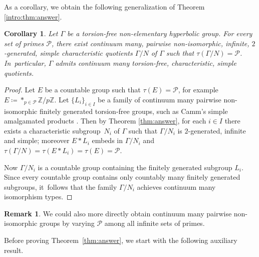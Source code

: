 \documentclass[11pt]{article}
\newtheorem{corollary}[theorem]{Corollary}
\theoremstyle{definition}
\newtheorem{remark}[theorem]{Remark}
\begin{document}
As a corollary, we obtain the following generalization of Theorem \ref{intro:thm:answer}.

\begin{corollary}
\label{cor:answer}
Let $\Gamma$ be a torsion-free non-elementary hyperbolic group. For every set of primes $\mathcal{P}$, there exist continuum many, pairwise non-isomorphic, infinite, $2$\nobreakdash-generated, simple characteristic quotients $\Gamma/N$ of $\Gamma$ such that $\tau(\Gamma/N) = \mathcal{P}$. In~particular, $\Gamma$ admits continuum many torsion-free, characteristic, simple quotients.
\end{corollary}

\begin{proof}
Let $E$ be a countable group such that $\tau(E) \!=\! \mathcal{P}$, for example \hbox{$E \!\coloneqq\! \ast_{p \in \mathcal{P}} \mathbb{Z}/p\mathbb{Z}$}.
Let $\{ L_i \}_{i \in I}$ be a family of continuum many pairwise non-isomorphic finitely generated torsion-free groups, such as Camm's simple amalgamated products \cite{camm}.
Then by Theorem \ref{thm:answer}, for each $i \in I$ there exists a characteristic subgroup~$N_i$ of $\Gamma$ such that $\Gamma / N_i$ is $2$-generated, infinite and simple; moreover $E \ast L_i$ embeds in $\Gamma / N_i$ and $\tau(\Gamma / N) = \tau(E \ast L_i) = \tau(E) = \mathcal{P}$.

Now $\Gamma / N_i$ is a countable group containing the finitely generated subgroup $L_i$.
Since every countable group contains only countably many finitely generated subgroups, it~follows that the family $\Gamma / N_i$ achieves continuum many isomorphism types.
\end{proof}

\begin{remark}
We could also more directly obtain continuum many pairwise non-isomorphic groups by varying $\mathcal{P}$ among all infinite sets of primes.
\end{remark}

Before proving Theorem~\ref{thm:answer}, we start with the following auxiliary result.
\end{document}
